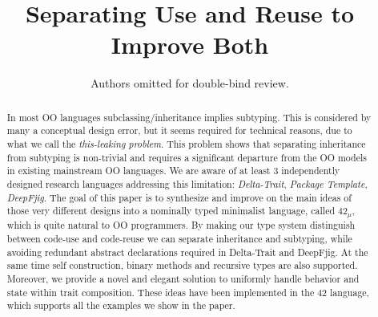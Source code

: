 \documentclass{llncs}
\newcommand\saveSpace{\vspace{-3pt}}
\newcommand\name{{\bf $42_{\mu}$}\xspace}
\begin{document}
%
\frontmatter          %
%
\pagestyle{headings}  %
%

\title{Separating Use and Reuse to Improve Both}
%

\begin{comment}
\author{Marco Servetto\inst{1} \and Bruno C. d. S. Oliveira\inst{2}}
%
\authorrunning{M. Servetto and B. Oliveira} %
%
\tocauthor{Marco Servetto and Bruno C. d. S. Oliveira}
%
\institute{Victoria University of Wellington, New Zealand,\\
\and
The University of Hong Kong, Hong Kong\\}
\end{comment}
\author{Authors omitted for double-bind review.}

\maketitle              %

\begin{abstract}
\saveSpace\saveSpace\saveSpace
In most OO languages subclassing/inheritance implies
subtyping. This is considered by many a conceptual design error, but it
seems required for technical reasons, due to what we call the
\emph{this-leaking problem}. This problem shows that separating
inheritance from subtyping is non-trivial and requires a significant
departure from the OO models in existing mainstream OO languages.
We are aware of at least 3 independently designed research languages 
addressing this limitation: \emph{Delta-Trait}, \emph{Package Template}, \emph{DeepFjig}.
The goal of this paper is to synthesize and improve on
the main ideas of those very different designs into a nominally typed
minimalist language, called \name, which is quite
natural to OO programmers.
By making our type system distinguish between code-use and code-reuse
we can separate inheritance and subtyping, while avoiding 
redundant abstract declarations required in Delta-Trait and
DeepFjig. At the same time self construction,
binary methods and recursive types are also supported.
Moreover, we provide a novel and elegant solution to uniformly
handle behavior and state within trait composition.
These ideas have been implemented in the 42 language, 
which supports all the examples we show in the paper.
\saveSpace\saveSpace\saveSpace

\saveSpace\saveSpace\saveSpace
\end{abstract}






%






\end{document}
